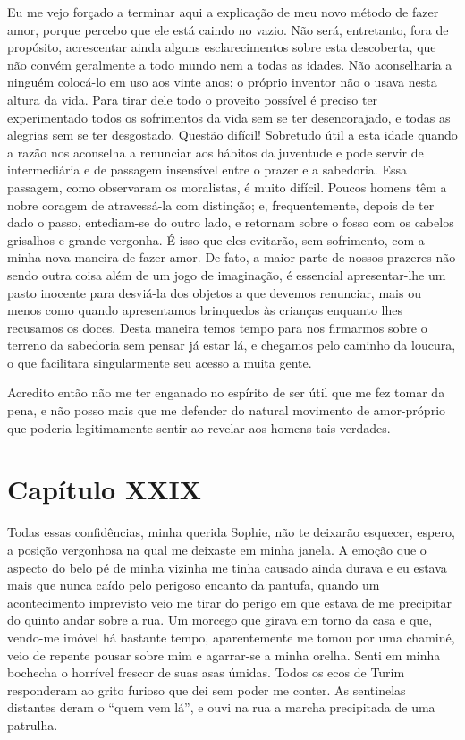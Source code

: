  Eu me vejo forçado a terminar aqui a explicação de meu novo método de
fazer amor, porque percebo que ele está caindo no vazio. Não será,
entretanto, fora de propósito, acrescentar ainda alguns esclarecimentos
sobre esta descoberta, que não convém geralmente a todo mundo nem a
todas as idades. Não aconselharia a ninguém colocá-lo em uso aos vinte
anos; o próprio inventor não o usava nesta altura da vida. Para tirar
dele todo o proveito possível é preciso ter experimentado todos os
sofrimentos da vida sem se ter desencorajado, e todas as alegrias sem
se ter desgostado. Questão difícil! Sobretudo útil a esta idade quando
a razão nos aconselha a renunciar aos hábitos da juventude e pode
servir de intermediária e de passagem insensível entre o prazer e a
sabedoria. Essa passagem, como observaram os moralistas, é muito
difícil. Poucos homens têm a nobre coragem de atravessá-la com
distinção; e, frequentemente, depois de ter dado o passo, entediam-se
do outro lado, e retornam sobre o fosso com os cabelos grisalhos e
grande vergonha. É isso que eles evitarão, sem sofrimento, com a minha
nova maneira de fazer amor. De fato, a maior parte de nossos prazeres
não sendo outra coisa além de um jogo de imaginação, é essencial
apresentar-lhe um pasto inocente para desviá-la dos objetos a que
devemos renunciar, mais ou menos como quando apresentamos brinquedos às
crianças enquanto lhes recusamos os doces. Desta maneira temos tempo
para nos firmarmos sobre o terreno da sabedoria sem pensar já estar lá,
e chegamos pelo caminho da loucura, o que facilitara singularmente seu
acesso a muita gente. 

 Acredito então não me ter enganado no espírito de ser útil que me fez
tomar da pena, e não posso mais que me defender do natural movimento de                      
amor-próprio que poderia legitimamente sentir ao revelar aos homens
tais verdades.

\section{Capítulo XXIX}

 Todas essas confidências, minha querida Sophie, não te deixarão
esquecer, espero, a posição vergonhosa na qual me deixaste em minha
janela. A emoção que o aspecto do belo pé de minha vizinha me tinha
causado ainda durava e eu estava mais que nunca caído pelo perigoso
encanto da pantufa, quando um acontecimento imprevisto veio me tirar do
perigo em que estava de me precipitar do quinto andar sobre a rua. Um
morcego que girava em torno da casa e que, vendo-me imóvel há bastante
tempo, aparentemente me tomou por uma chaminé, veio de repente pousar
sobre mim e agarrar-se a minha orelha. Senti em minha bochecha o
horrível frescor de suas asas úmidas. Todos os ecos de Turim
responderam ao grito furioso que dei sem poder me conter. As sentinelas
distantes deram o ``quem vem lá'', e ouvi na rua a marcha precipitada de
uma patrulha.  

